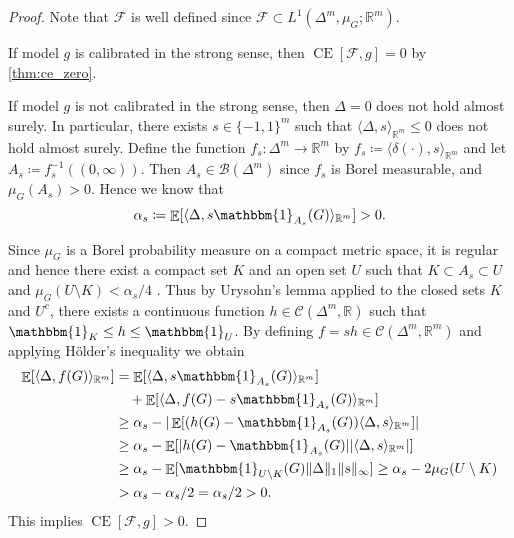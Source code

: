 \documentclass{article}
\DeclareMathOperator{\Expect}{\mathbb{E}}
\DeclareMathOperator{\measure}{CE}
\begin{document}
\begin{proof}
  Note that $\mathcal{F}$ is well defined since
  $\mathcal{F} \subset L^1(\Delta^m, \mu_G; \mathbb{R}^m)$.

  If model $g$ is calibrated in the strong sense, then
  $\measure[\mathcal{F}, g] = 0$ by \cref{thm:ce_zero}.

  If model $g$ is not calibrated in the strong sense, then $\Delta = 0$ does not
  hold almost surely. In particular, there exists $s \in \{-1,1\}^m$ such that
  $\langle \Delta, s\rangle_{\mathbb{R}^m} \leq 0$ does not hold almost surely.
  Define the function $f_s \colon \Delta^m \to \mathbb{R}^m$ by
  $f_s \coloneqq \langle \delta(\cdot), s \rangle_{\mathbb{R}^m}$ and let
  $A_s \coloneqq f_s^{-1}((0, \infty))$. Then $A_s \in \mathcal{B}(\Delta^m)$
  since $f_s$ is Borel measurable, and $\mu_G(A_s) > 0$. Hence we know that
  \begin{equation*}
    \alpha_s \coloneqq \Expect[\langle \Delta, s\mathbbm{1}_{A_s}(G) \rangle_{\mathbb{R}^m}] > 0.
  \end{equation*}

  Since $\mu_G$ is a Borel probability measure on a compact metric space, it is
  regular and hence there exist a compact set $K$ and an open set $U$ such that
  $K \subset A_s \subset U$ and $\mu_G(U \setminus K) < \alpha_s / 4$
  \citep[Theorem~2.17]{rudin86_real}. Thus by Urysohn's lemma applied to the
  closed sets $K$ and $U^c$, there exists a continuous function
  $h \in \mathcal{C}(\Delta^m, \mathbb{R})$ such that
  $\mathbbm{1}_K \leq h \leq \mathbbm{1}_U$. By defining
  $f = sh \in \mathcal{C}(\Delta^m, \mathbb{R}^m)$ and applying Hölder's
  inequality we obtain
  \begin{equation*}
    \begin{split}
      \Expect[\langle \Delta, f(G) \rangle_{\mathbb{R}^m}] &= \Expect[\langle \Delta, s\mathbbm{1}_{A_s}(G) \rangle_{\mathbb{R}^m}] \\
      &\quad + \Expect[\langle \Delta, f(G) - s\mathbbm{1}_{A_s}(G) \rangle_{\mathbb{R}^m}] \\
      &\geq \alpha_s - |\Expect[(h(G) - \mathbbm{1}_{A_s}(G)) \langle \Delta, s \rangle_{\mathbb{R}^m}]| \\
      &\geq \alpha_s - \Expect[|h(G) - \mathbbm{1}_{A_s}(G)| |\langle \Delta, s \rangle_{\mathbb{R}^m}|] \\
      &\geq \alpha_s - \Expect[\mathbbm{1}_{U \setminus K}(G) \|\Delta\|_1 \|s\|_{\infty}] \geq \alpha_s - 2 \mu_G(U\setminus K) \\
      &> \alpha_s - \alpha_s/2 = \alpha_s/2 > 0.
    \end{split}
  \end{equation*}
  This implies $\measure[\mathcal{F}, g] > 0$.
\end{proof}
\end{document}
